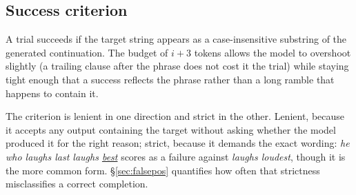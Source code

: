 \subsection{Success criterion}
\label{sec:criterion}

A trial succeeds if the target string appears as a case-insensitive substring
of the generated continuation. The budget of $i+3$ tokens allows the model to
overshoot slightly (a trailing clause after the phrase does not cost it the
trial) while staying tight enough that a success reflects the phrase rather
than a long ramble that happens to contain it.

The criterion is lenient in one direction and strict in the other. Lenient,
because it accepts any output containing the target without asking whether the
model produced it for the right reason; strict, because it demands the exact
wording: \textit{he who laughs last laughs \underline{best}} scores as a
failure against \textit{laughs loudest}, though it is the more common form.
\S\ref{sec:falsepos} quantifies how often that strictness misclassifies a
correct completion.
